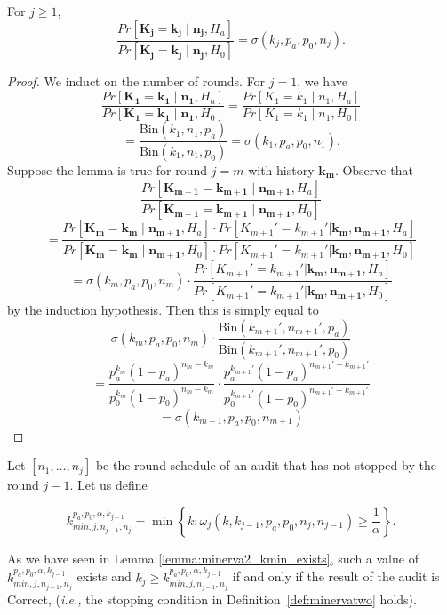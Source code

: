 \begin{lemma}
\label{lemma:any_ratio_is_sigma_simple}
For $j\ge 1$,
$$\frac{Pr[\bm{K_j}=\bm{k_j} \mid \bm{n_j}, H_a]}{Pr[\bm{K_j}=\bm{k_j} \mid \bm{n_j}, H_0]} = \sigma(k_j, p_a, p_0, n_j).$$
\end{lemma}
\begin{proof}
We induct on the number of rounds.
For $j=1$, we have
$$\frac{Pr[\bm{K_1}=\bm{k_1} \mid \bm{n_1},H_a]}{Pr[\bm{K_1}=\bm{k_1} \mid  \bm{n_1},H_0]} =\frac{Pr[K_1 = k_{1} \mid n_1,H_a]}{Pr[K_1 = k_1 \mid n_1,H_0]} $$$$= \frac{\text{Bin}(k_1,n_1,p_a)}{\text{Bin}(k_1,n_1,p_0)}=\sigma(k_1, p_a, p_0, n_1).$$
Suppose the lemma is true for round $j=m$ with history $\bm{k_m}$.
Observe that
 $$\frac{Pr[\bm{K_{m+1}}=\bm{k_{m+1}} \mid \bm{n_{m+1}},H_a]}{Pr[\bm{K_{m+1}}=\bm{k_{m+1}} \mid \bm{n_{m+1}}, H_0]} $$$$= \frac{ Pr[\bm{K_{m}}=\bm{k_{m}}\mid \bm{n_{m+1}},H_a] \cdot Pr[K_{m+1}'=k_{m+1}'|\bm{k_m},\bm{n_{m+1}},H_a]}{ Pr[\bm{K_{m}}= \bm{k_{m}} \mid  \bm{n_{m+1}},H_0]  \cdot  Pr[K_{m+1}'=k_{m+1}'|\bm{k_m},\bm{n_{m+1}},H_0]  }$$
 $$=\sigma(k_m, p_a, p_0, n_m) \cdot \frac{Pr[K_{m+1}'=k_{m+1}'|\bm{k_m}, \bm{n_{m+1}}, H_a]}{Pr[K_{m+1}'=k_{m+1}'|\bm{k_m},\bm{n_{m+1}},H_0]}$$
 by the induction hypothesis.
Then this is simply equal to
 $$\sigma(k_m, p_a, p_0, n_m)\cdot\frac{\text{Bin}(k_{m+1}',n_{m+1}',p_a)}{\text{Bin}(k_{m+1}',n_{m+1}',p_0)}
 $$$$
 =\frac{p_a^{k_m} (1-p_a)^{n_m-k_m}}{p_0^{k_m} (1-p_0)^{n_m-k_m}} \cdot
 \frac{p_a^{k_{m+1}'} (1-p_a)^{n_{m+1}'-k_{m+1}'}}{p_0^{k_{m+1}'} (1-p_0)^{n_{m+1}'-k_{m+1}'}}
 $$
 $$
 =\sigma(k_{m+1}, p_a, p_0, n_{m+1})
 $$
\end{proof}


\begin{definition} 
\label{def:kmin}
Let $[n_1, \ldots, n_j]$ be the round schedule of an audit that has not stopped by the round $j-1$. Let us define 
\begin{small}
\begin{equation}\label{eq:kMin}
k^{p_a, p_0, \alpha, k_{j-1}}_{min, j, n_{j-1}, n_j}  =
  \min\left\{k : \omega_j(k, k_{j-1},p_a,p_0,n_j, n_{j-1}) \geq \frac{1}{\alpha}  \right\}.
\end{equation}
\end{small}
\end{definition}
As we have seen in Lemma \ref{lemma:minerva2_kmin_exists}, such a value of $k^{p_a, p_0, \alpha, k_{j-1}}_{min, j, n_{j-1}, n_j}$ exists and $k_j \geq k^{p_a, p_0, \alpha, k_{j-1}}_{min, j, n_{j-1}, n_j} $ if and only if the result of the audit is Correct, (\textit{i.e.,} the stopping condition in Definition~\ref{def:minervatwo} holds).

